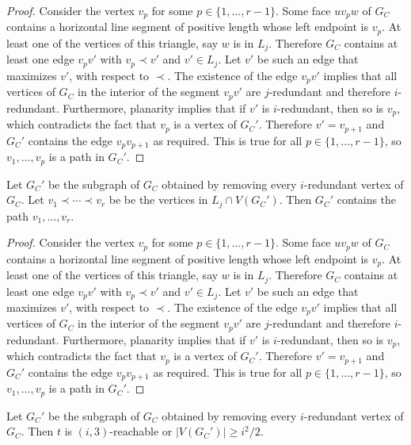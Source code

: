 \documentclass{patmorin}
\begin{document}
\begin{proof}
  Consider the vertex $v_p$ for some $p\in\{1,\ldots,r-1\}$. Some face $uv_pw$ of $G_C$ contains a horizontal line segment of positive length whose left endpoint is $v_p$.  At least one of the vertices of this triangle, say $w$ is in $L_j$. Therefore $G_C$ contains at least one edge $v_pv'$ with $v_p\prec v'$ and $v'\in L_j$.  Let $v'$ be such an edge that maximizes $v'$, with respect to $\prec$.  The existence of the edge $v_pv'$ implies that all vertices of $G_C$ in the interior of the segment $v_pv'$ are $j$-redundant and therefore $i$-redundant.  Furthermore, planarity implies that if $v'$ is $i$-redundant, then so is $v_p$, which contradicts the fact that $v_p$ is a vertex of $G_C'$.  Therefore $v'=v_{p+1}$ and $G_C'$ contains the edge $v_pv_{p+1}$ as required.  This is true for all $p\in\{1,\ldots,r-1\}$, so $v_1,\ldots,v_p$ is a path in $G_C'$.
\end{proof}


\begin{clm}
   Let $G_C'$ be the subgraph of $G_C$ obtained by removing every $i$-redundant vertex of $G_C$.  Let $v_1\prec\cdots\prec v_r$ be be the vertices in $L_j\cap V(G_C')$.  Then $G_C'$ contains the path $v_1,\ldots,v_r$.
\end{clm}

\begin{proof}
  Consider the vertex $v_p$ for some $p\in\{1,\ldots,r-1\}$. Some face $uv_pw$ of $G_C$ contains a horizontal line segment of positive length whose left endpoint is $v_p$.  At least one of the vertices of this triangle, say $w$ is in $L_j$. Therefore $G_C$ contains at least one edge $v_pv'$ with $v_p\prec v'$ and $v'\in L_j$.  Let $v'$ be such an edge that maximizes $v'$, with respect to $\prec$.  The existence of the edge $v_pv'$ implies that all vertices of $G_C$ in the interior of the segment $v_pv'$ are $j$-redundant and therefore $i$-redundant.  Furthermore, planarity implies that if $v'$ is $i$-redundant, then so is $v_p$, which contradicts the fact that $v_p$ is a vertex of $G_C'$.  Therefore $v'=v_{p+1}$ and $G_C'$ contains the edge $v_pv_{p+1}$ as required.  This is true for all $p\in\{1,\ldots,r-1\}$, so $v_1,\ldots,v_p$ is a path in $G_C'$.
\end{proof}


\begin{clm}\label{bam}
  Let $G_C'$ be the subgraph of $G_C$ obtained by removing every $i$-redundant vertex of $G_C$.  Then $t$ is $(i,3)$-reachable or $|V(G_C')|\ge i^2/2$.
\end{clm}
\end{document}
